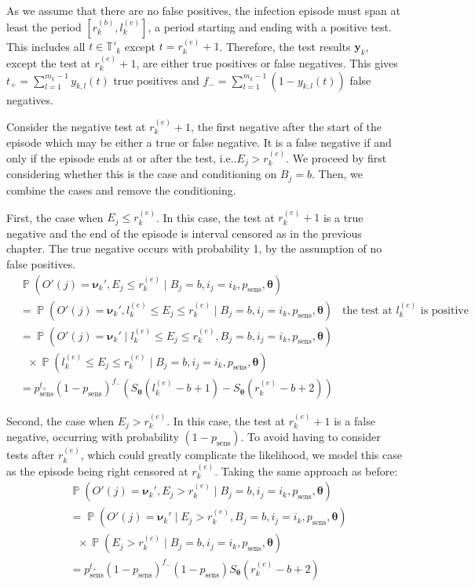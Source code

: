 \documentclass[12pt]{article}
\makeatletter
\DeclareMathOperator{\prob}{\mathbb{P}}
\renewcommand{\vec}[1]{\bm{#1}}
\newcommand{\psens}{p_\text{sens}}
\newcommand{\sched}{\mathbb{T}}
\DeclareRobustCommand\onedot{\futurelet\@let@token\@onedot}
\def\@onedot{\ifx\@let@token.\else.\null\fi\xspace}
\def\ie{i.e\onedot} \def\Ie{{I.e}\onedot}
\makeatother
\begin{document}
As we assume that there are no false positives, the infection episode must span at least the period $[r^{(b)}_k, l^{(e)}_k]$, a period starting and ending with a positive test.
This includes all $t \in \sched'_k$ except $t = r_k^{(e)}+1$.
Therefore, the test results $\vec{y}_k$, except the test at $r_k^{(e)}+1$, are either true positives or false negatives.
This gives $t_+ = \sum_{l=1}^{m_k-1} y_{k,l}(t)$ true positives and $f_- = \sum_{l=1}^{m_k-1} (1 - y_{k,l}(t))$ false negatives.

Consider the negative test at $r_k^{(e)}+1$, the first negative after the start of the episode which may be either a true or false negative.
It is a false negative if and only if the episode ends at or after the test, \ie $E_j > r_k^{(e)}$.
We proceed by first considering whether this is the case and conditioning on $B_j = b$.
Then, we combine the cases and remove the conditioning.

First, the case when $E_j \leq r_k^{(e)}$.
In this case, the test at $r_k^{(e)}+1$ is a true negative and the end of the episode is interval censored as in the previous chapter.
The true negative occurs with probability 1, by the assumption of no false positives.
\begin{align}
&\prob(O'(j) = \vec{\nu}_k', E_j \leq r_k^{(e)} \mid B_j = b, i_j = i_k, \psens, \vec{\theta}) \\
&= \prob(O'(j) = \vec{\nu}_k', l_k^{(e)} \leq E_j \leq r_k^{(e)} \mid B_j = b, i_j = i_k, \psens, \vec{\theta}) &\text{the test at $l_k^{(e)}$ is positive} \\
&= \prob(O'(j) = \vec{\nu}_k' \mid l_k^{(e)} \leq E_j \leq r_k^{(e)}, B_j = b, i_j = i_k, \psens, \vec{\theta}) \\
&\ \ \  \times \prob(l_k^{(e)} \leq E_j \leq r_k^{(e)} \mid B_j = b, i_j = i_k, \psens, \vec{\theta}) \\
&= p_\text{sens}^{t_+} (1 - p_\text{sens})^{f_-} \left( S_{\vec{\theta}}(l_k^{(e)} - b + 1) - S_{\vec{\theta}}(r_k^{(e)} - b + 2) \right)
\label{imperf-test:eq:ll-ei-lt-ri}
\end{align}

Second, the case when $E_j > r_k^{(e)}$.
In this case, the test at $r_k^{(e)}+1$ is a false negative, occurring with probability $(1 - p_\text{sens})$.
To avoid having to consider tests after $r_k^{(e)}$, which could greatly complicate the likelihood, we model this case as the episode being right censored at $r_k^{(e)}$.
Taking the same approach as before:
\begin{align}
&\prob(O'(j) = \vec{\nu}_k', E_j > r_k^{(e)} \mid B_j = b, i_j = i_k, \psens, \vec{\theta}) \\
&= \prob(O'(j) = \vec{\nu}_k' \mid E_j > r_k^{(e)}, B_j = b, i_j = i_k, \psens, \vec{\theta}) \\
  &\ \ \  \times \prob(E_j > r_k^{(e)} \mid B_j = b, i_j = i_k, \psens, \vec{\theta}) \\
&= p_\text{sens}^{t_+} (1 - p_\text{sens})^{f_-} (1 - p_\text{sens}) S_{\vec{\theta}}(r_k^{(e)} - b + 2)
\label{imperf-test:eq:ll-ei-gt-ri}
\end{align}
\end{document}
